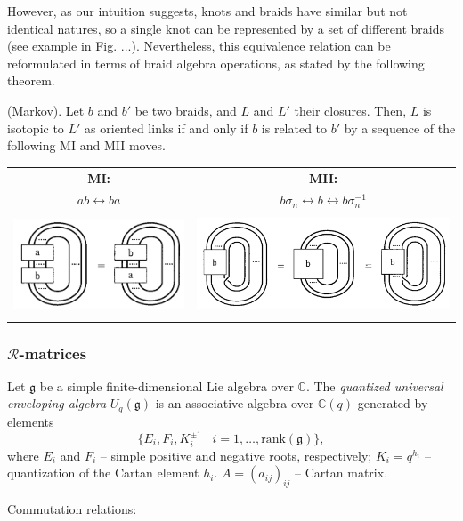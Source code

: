 \documentclass[12pt,a4paper]{article}
\begin{document}
However, as our intuition suggests, knots and braids have similar but not identical natures, so a single knot can be represented by a set of different braids (see example in Fig. ...). Nevertheless, this equivalence relation can be reformulated in terms of braid algebra operations, as stated by the following theorem.
\begin{tcolorbox}
\begin{theorem}\label{thm:Alexander}
   (Markov).  Let $b$ and $b'$ be two braids, and $L$ and $L'$ their closures.
Then, $L$ is isotopic to $L'$ as oriented links if and only if $b$ is related to $b'$ by a
sequence of the following MI and MII moves.

\begin{center}
\begin{tabular}{c c}
\textbf{MI:} & \textbf{MII:} \\
$ab \longleftrightarrow ba$ & $b \sigma_n \longleftrightarrow b \longleftrightarrow b \sigma_n^{-1}$ \\[2mm]  
\includegraphics[height=3cm]{../img/MI.png} &
\includegraphics[height=3cm]{../img/MII.png}
\end{tabular}
\end{center}

\end{theorem}
\end{tcolorbox} 

\subsubsection{$\mathcal{R}$-matrices}
\begin{tcolorbox}
\begin{definition}
    Let $\mathfrak{g}$ be a simple finite-dimensional Lie algebra over $\mathbb{C}$. 
The \emph{quantized universal enveloping algebra} $U_q(\mathfrak{g})$ is an associative algebra over $\mathbb{C}(q)$ generated by elements
\[
\{ E_i, F_i, K_i^{\pm 1} \mid i = 1, \dots, \mathrm{rank}(\mathfrak{g}) \},\] 
where $E_i$ and $F_i$ -- simple positive and negative roots, respectively; $K_i = q^{h_i}$ -- quantization of the Cartan element $h_i$. $A = (a_{ij})_{ij}$ -- Cartan matrix.

Commutation relations:




\end{definition}
\end{tcolorbox}

\printbibliography
\end{document}
